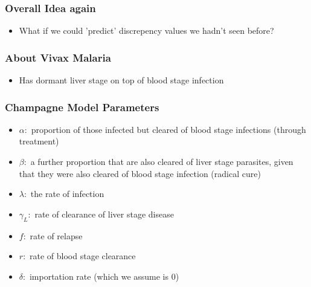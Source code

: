 \documentclass{beamer}
\begin{document}
\begin{frame}
\end{frame}

\begin{frame}
    \frametitle{Overall Idea again}
    \begin{itemize}
        \item What if we could 'predict' discrepency values we hadn't seen before?
    \end{itemize}
\end{frame}

\begin{frame}
    \frametitle{About Vivax Malaria}
    \begin{itemize}
        \item Has dormant liver stage on top of blood stage infection
    \end{itemize}
\end{frame}

\begin{frame}
    \frametitle{Champagne Model Parameters}\begin{itemize}
        \item $\alpha:$ proportion of those infected but cleared of blood stage infections (through treatment)
        \item $\beta:$ a further proportion that are also cleared of liver stage parasites, given that they were also cleared of blood stage infection (radical cure)
        \item $\lambda:$ the rate of infection
        \item $\gamma_L:$ rate of clearance of liver stage disease
        \item $f:$ rate of relapse
        \item $r:$ rate of blood stage clearance
        \item $\delta:$ importation rate (which we assume is 0)
    \end{itemize}

\end{frame}
\end{document}
